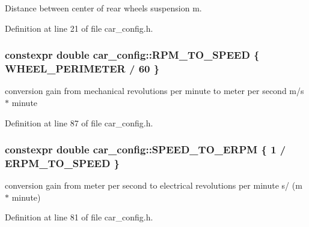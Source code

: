 Distance between center of rear wheels suspension  m. 



Definition at line 21 of file car\+\_\+config.\+h.

\subsubsection[{\texorpdfstring{R\+P\+M\+\_\+\+T\+O\+\_\+\+S\+P\+E\+ED}{RPM_TO_SPEED}}]{\setlength{\rightskip}{0pt plus 5cm}constexpr double car\+\_\+config\+::\+R\+P\+M\+\_\+\+T\+O\+\_\+\+S\+P\+E\+ED \{ {\bf W\+H\+E\+E\+L\+\_\+\+P\+E\+R\+I\+M\+E\+T\+ER} / 60 \}}\hypertarget{namespacecar__config_aee034b6adfd7932f245bc94d869f2bb6}{}\label{namespacecar__config_aee034b6adfd7932f245bc94d869f2bb6}


conversion gain from mechanical revolutions per minute to meter per second  m/s $\ast$ minute 



Definition at line 87 of file car\+\_\+config.\+h.

\subsubsection[{\texorpdfstring{S\+P\+E\+E\+D\+\_\+\+T\+O\+\_\+\+E\+R\+PM}{SPEED_TO_ERPM}}]{\setlength{\rightskip}{0pt plus 5cm}constexpr double car\+\_\+config\+::\+S\+P\+E\+E\+D\+\_\+\+T\+O\+\_\+\+E\+R\+PM \{ 1 / {\bf E\+R\+P\+M\+\_\+\+T\+O\+\_\+\+S\+P\+E\+ED} \}}\hypertarget{namespacecar__config_a0f37aa7e52366aebb006c6e1d3317900}{}\label{namespacecar__config_a0f37aa7e52366aebb006c6e1d3317900}


conversion gain from meter per second to electrical revolutions per minute  s/ (m $\ast$ minute) 



Definition at line 81 of file car\+\_\+config.\+h.

